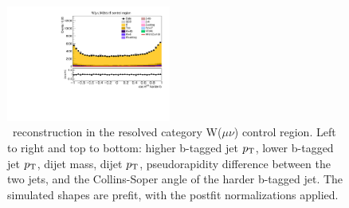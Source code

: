 \begin{figure}[tbp]
\begin{center}
    \includegraphics[width=0.48\textwidth]{figures/wlnhbb2016/resolved/WmnWH2TopCR_hbbCosThetaCSJ1.pdf}
    \caption{\HBB\ reconstruction in the resolved category W($\mu\nu$) \ttbar control region.
    Left to right and top to bottom: higher b-tagged jet $p_{\mathrm{T}}$, lower b-tagged jet $p_{\mathrm{T}}$, dijet mass, dijet $p_{\mathrm{T}}$, 
    pseudorapidity difference between the two jets, and the Collins-Soper angle of the harder b-tagged jet.
    The simulated shapes are prefit, with the postfit normalizations applied.}
    \label{fig:res_WmnTT_Hbb}
  \end{center}
\end{figure}
\clearpage

